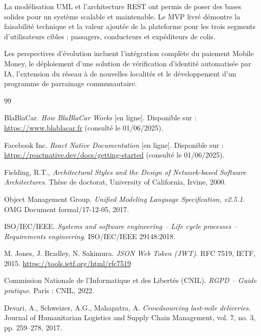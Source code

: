 \documentclass[12pt, a4paper]{report}
\begin{document}
La modélisation \ac{UML} et l'architecture \ac{REST} ont permis de poser des bases
solides pour un système scalable et maintenable. Le \ac{MVP} livré démontre la
faisabilité technique et la valeur ajoutée de la plateforme pour les trois segments
d'utilisateurs cibles : passagers, conducteurs et expéditeurs de colis.

Les perspectives d'évolution incluent l'intégration complète du paiement Mobile Money,
le déploiement d'une solution de vérification d'identité automatisée par \ac{IA},
l'extension du réseau à de nouvelles localités et le développement d'un programme de
parrainage communautaire.

\setcounter{page}{1}

\begin{thebibliography}{99}

BlaBlaCar. \textit{How BlaBlaCar Works} [en ligne].
Disponible sur : \url{https://www.blablacar.fr} (consulté le 01/06/2025).

Facebook Inc. \textit{React Native Documentation} [en ligne].
Disponible sur : \url{https://reactnative.dev/docs/getting-started} (consulté le 01/06/2025).

Fielding, R.T., \textit{Architectural Styles and the Design of Network-based Software Architectures}.
Thèse de doctorat, University of California, Irvine, 2000.

Object Management Group. \textit{Unified Modeling Language Specification, v2.5.1}.
OMG Document formal/17-12-05, 2017.

ISO/IEC/IEEE. \textit{Systems and software engineering -- Life cycle processes --
Requirements engineering}. ISO/IEC/IEEE 29148:2018.

M. Jones, J. Bradley, N. Sakimura. \textit{JSON Web Token (JWT)}.
RFC 7519, IETF, 2015. \url{https://tools.ietf.org/html/rfc7519}

Commission Nationale de l'Informatique et des Libertés (CNIL). \textit{RGPD -- Guide pratique}.
Paris : CNIL, 2022.

Devari, A., Schweizer, A.G., Mahapatra, A.
\textit{Crowdsourcing last-mile deliveries}.
Journal of Humanitarian Logistics and Supply Chain Management, vol. 7, no. 3,
pp. 259--278, 2017.

\end{thebibliography}
\end{document}
